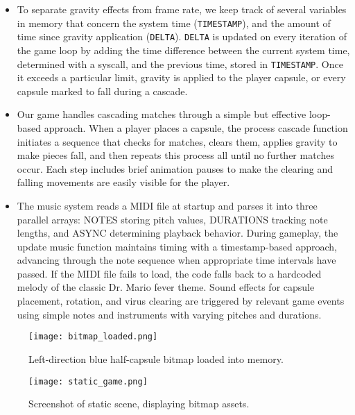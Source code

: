 \documentclass{article}
\begin{document}
\begin{enumerate}
\begin{itemize}
\item To separate gravity effects from frame rate, we keep track of several variables in memory that concern the system time (\verb|TIMESTAMP|), and the amount of time since gravity application (\verb|DELTA|). \verb|DELTA| is updated on every iteration of the game loop by adding the time difference between the current system time, determined with a syscall, and the previous time, stored in \verb|TIMESTAMP|. Once it exceeds a particular limit, gravity is applied to the player capsule, or every capsule marked to fall during a cascade.

\item Our game handles cascading matches through a simple but effective loop-based approach. When a player places a capsule, the process cascade function initiates a sequence that checks for matches, clears them, applies gravity to make pieces fall, and then repeats this process all until no further matches occur. Each step includes brief animation pauses to make the clearing and falling movements are easily visible for the player.

\item The music system reads a MIDI file at startup and parses it into three parallel arrays: NOTES storing pitch values, DURATIONS tracking note lengths, and ASYNC determining playback behavior. During gameplay, the update music function maintains timing with a timestamp-based approach, advancing through the note sequence when appropriate time intervals have passed. If the MIDI file fails to load, the code falls back to a hardcoded melody of the classic Dr. Mario fever theme. Sound effects for capsule placement, rotation, and virus clearing are triggered by relevant game events using simple notes and instruments with varying pitches and durations.

\end{itemize}
\end{enumerate}



\begin{figure}
    \centering
    \texttt{[image: bitmap\_loaded.png]}
    \caption{Left-direction blue half-capsule bitmap loaded into memory.}
    \label{fig:bitmap-loaded}
\end{figure}

\begin{figure}[ht!]
    \centering
    \texttt{[image: static\_game.png]}
    \caption{Screenshot of static scene, displaying bitmap assets.}
    \label{fig:static-game}
\end{figure}
\end{document}
